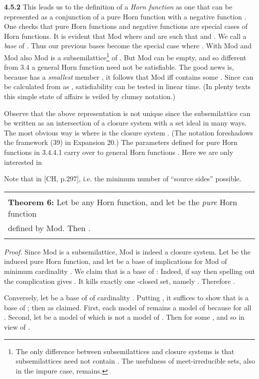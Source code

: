 \documentclass[11pt]{article}
\begin{document}
{\bf 4.5.2} This leads us to the definition of a {\it Horn function}  as one that can be represented as a conjunction  of a pure Horn function  with a negative function . One checks that pure Horn functions and negative functions are special cases of Horn functions. It is evident that Mod where  and  are such that  and .  
We call  a {\it base} of . Thus our previous bases  become the special case where . With Mod and Mod also Mod is a subsemilattice\footnote{The only difference between subsemilattices  and closure systems  is that subsemilattices need not contain . The usefulness of meet-irreducible sets, also in the impure case, remains.} of . But Mod can be empty, and so different from 3.4 a general Horn function  need not be satisfiable. The good news is, because  has a {\it smallest} member , it follows that Mod iff  contains some . Since  can be calculated from  as , satisfiability can be tested in linear time. (In plenty texts this simple state of affairs is veiled by clumsy notation.)


Observe that the above representation  is not unique since the subsemilattice  can be written as an intersection  of a closure system  with a set ideal  in many ways. The most obvious way is  where  is the closure system . (The notation  foreshadows the framework (39) in Expansion 20.) 
The parameters defined for pure Horn functions  in 3.4.4.1 carry over to general Horn functions . Here we are only interested in 

Note that  in [CH, p.297], i.e. the minimum number of ``source sides'' possible.


\begin{tabular}{|l|} \hline \\
{\bf Theorem 6:} Let  be any Horn function, and let  be the {\it pure} Horn function\\
defined by Mod. Then .\\ \\ \hline \end{tabular}

{\it Proof.} Since Mod is a subsemilattice, Mod is indeed a closure system. Let  be the induced pure Horn function, and let  be a base of implications for Mod of minimum cardinality . We claim that  is a base of : Indeed, if say  then spelling out the complication  gives . It kills exactly one -closed set, namely . Therefore . 

Conversely, let  be a base of  of cardinality . Putting , it suffices to show that  is a base of ;  then  as claimed. First, each model  of  remains a model of  because  for all . Second, let  be a model of  which is not a model of . Then  for some , and so  in view of . \quad 
\end{document}
